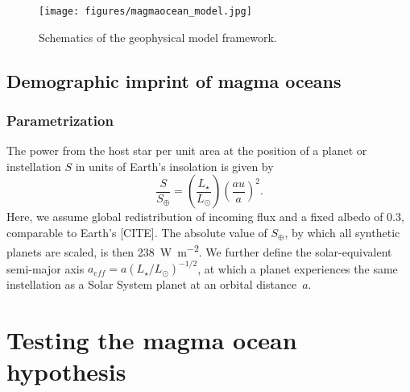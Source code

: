 \documentclass[modern]{aastex631}
\begin{document}
\begin{figure}[!ht]
    \begin{centering}
        \texttt{[image: figures/magmaocean\_model.jpg]}
        \caption{Schematics of the geophysical model framework.}
        \label{fig:magmaocean_model}
    \end{centering}
\end{figure}


\subsection{Demographic imprint of magma oceans}

\subsubsection{Parametrization}
\label{sec:mo_model}



\begin{note}
    The power from the host star per unit area at the position of a planet or instellation $S$ in units of Earth's insolation is given by
    \begin{equation}
        \frac{S}{S_\oplus} = \left(\frac{L_\star}{L_\odot}\right) \left(\frac{au}{a}\right)^2 .
    \end{equation}
    Here, we assume global redistribution of incoming flux and a fixed albedo of $0.3$, comparable to Earth's [CITE].
    The absolute value of $S_\oplus$, by which all synthetic planets are scaled, is then \SI{238}{\watt\per\square\meter}.
    We further define the solar-equivalent semi-major axis $a_{eff} = a (L_\star/L_\odot)^{-1/2}$, at which a planet experiences the same instellation as a Solar System planet at an orbital distance~$a$.
\end{note}





\section{Testing the magma ocean hypothesis}
\end{document}
